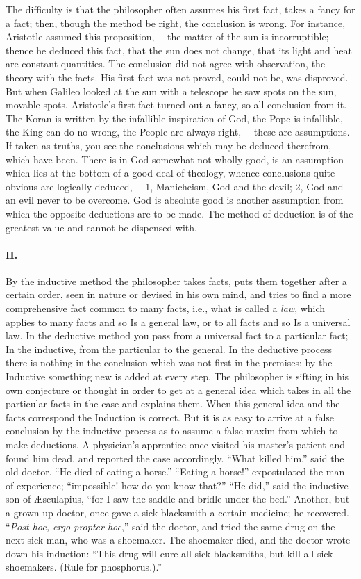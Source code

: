 \documentclass[12pt]{article}
\begin{document}
The difficulty is that the philosopher often assumes his first fact, takes a fancy for a fact; then, though the method be right, the conclusion is wrong. For instance, Aristotle assumed this proposition,--- the matter of the sun is incorruptible; thence he deduced this fact, that the sun does not change, that its light and heat are constant quantities. The conclusion did not agree with observation, the theory with the facts. His first fact was not proved, could not be, was disproved. But when Galileo looked at the sun with a telescope he saw spots on the sun, movable spots. Aristotle's first fact turned out a fancy, so all conclusion from it. The Koran is written by the infallible inspiration of God, the Pope is infallible, the King can do no wrong, the People are always right,--- these are assumptions. If taken as truths, you see the conclusions which may be deduced therefrom,--- which have been. There is in God somewhat not wholly good, is an assumption which lies at the bottom of a good deal of theology, whence conclusions quite obvious are logically deduced,--- 1, Manicheism, God and the devil; 2, God and an evil never to be overcome. God is absolute good is another assumption from which the opposite deductions are to be made. The method of deduction is of the greatest value and cannot be dispensed with. 

\paragraph{II.} By the inductive method the philosopher takes facts, puts them together after a certain order, seen in nature or devised in his own mind, and tries to find a more comprehensive fact common to many facts, i.e., what is called a \emph{law}, which applies to many facts and so Is a general law, or to all facts and so Is a universal law. In the deductive method you pass from a universal fact to a particular fact; In the inductive, from the particular to the general. In the deductive process there is nothing in the conclusion which was not first in the premises; by the Inductive something new is added at every step. The philosopher is sifting in his own conjecture or thought in order to get at a general idea which takes in all the particular facts in the case and explains them. When this general idea and the facts correspond the Induction is correct. But it is as easy to arrive at a false conclusion by the inductive process as to assume a false maxim from which to make deductions. A physician's apprentice once visited his master's patient and found him dead, and reported the case accordingly. ``What killed him.'' said the old doctor. ``He died of eating a horse.'' ``Eating a horse!'' expostulated the man of experience; ``impossible! how do you know that?'' ``He did,'' said the inductive son of {\AE}sculapius, ``for I saw the saddle and bridle under the bed.'' Another, but a grown-up doctor, once gave a sick blacksmith a certain medicine; he recovered. ``\emph{Post hoc, ergo propter hoc},'' said the doctor, and tried the same drug on the next sick man, who was a shoemaker. The shoemaker died, and the doctor wrote down his induction: ``This drug will cure all sick blacksmiths, but kill all sick shoemakers. (Rule for phosphorus.).'' 
\end{document}
